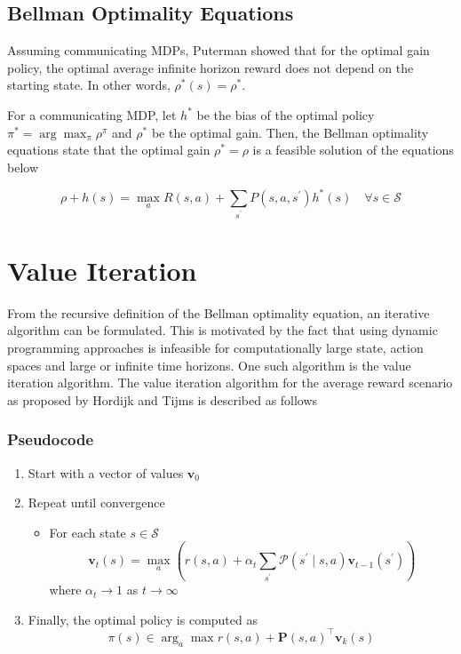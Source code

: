 \subsection{Bellman Optimality Equations}

Assuming communicating MDPs, Puterman \cite{puterman_chapter_1990} showed that for the optimal gain policy, the optimal average infinite horizon reward does not depend on the starting state. In other words, $\rho^*(s) = \rho^*$.

For a communicating MDP, let $h^*$ be the bias of the optimal policy $\pi^* = \arg \max_\pi \rho^\pi$ and $\rho^*$ be the optimal gain. 
Then, the Bellman optimality equations state that the optimal gain $\rho^* = \rho$ is a feasible solution of the equations below 

\begin{equation}
    \rho + h(s) = \max_a R(s, a) + \sum_{s^\prime} P(s, a, s^\prime) h^*(s) \quad \forall s \in \mathcal{S}
\end{equation}

\section{Value Iteration}

From the recursive definition of the Bellman optimality equation, an iterative algorithm can be formulated. 
This is motivated by the fact that using dynamic programming approaches is infeasible for computationally large state, action spaces and large or infinite time horizons.
One such algorithm is the value iteration algorithm. The value iteration algorithm for the average reward scenario as proposed by Hordijk and Tijms \cite{hordijk_modified_1975} is described as follows

\subsubsection*{Pseudocode}
\begin{enumerate}
    \item Start with a vector of values $\mathbf{v}_0$
    \item Repeat until convergence 
    
    \begin{itemize}
        \item For each state $s \in \mathcal{S}$
        $$\mathbf{v}_t(s) = \max_a \left(r(s, a) + \alpha_t \sum_{s^\prime} \mathcal{P}(s^\prime \mid s, a) \mathbf{v}_{t-1}(s^\prime) \right)$$
        where $\alpha_t \to 1$ as $t \to \infty$
    \end{itemize}
    
    
    \item Finally, the optimal policy is computed as
    $$\pi(s) \in \arg_a\max r(s,a) + \mathbf{P}(s,a)^\top \mathbf{v}_k(s) $$
    
\end{enumerate}

